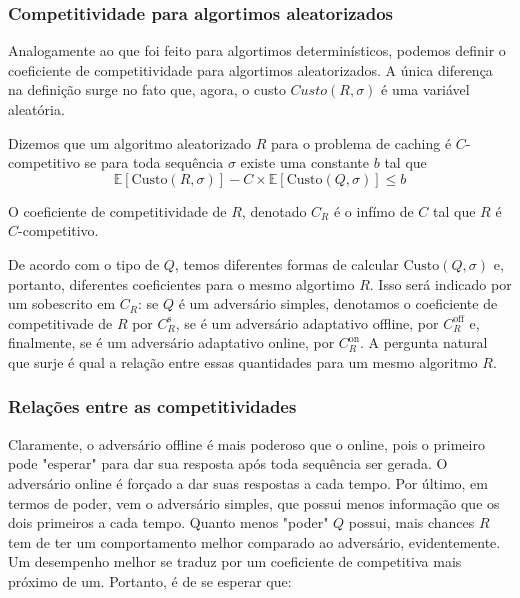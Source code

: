 \documentclass[a4paper,oneside,reqno,12pt]{amsart}
\begin{document}
\subsubsection{Competitividade para algortimos aleatorizados}

Analogamente ao que foi feito para algortimos determinísticos, podemos definir o coeficiente de competitividade para algortimos aleatorizados. A única diferença na definição surge no fato que, agora, o custo \(Custo(R, \sigma)\) é uma variável aleatória.

\begin{definition}
  Dizemos que um algoritmo aleatorizado \(R\) para o problema de caching é \(C\)-competitivo se para toda sequência \(\sigma\) existe uma constante \(b\) tal que
  \begin{equation}
    \mathbb{E}[\text{Custo}(R, \sigma)] - C \times \mathbb{E}[\text{Custo}(Q, \sigma)] \leqslant b
  \end{equation}
  
\end{definition}

O coeficiente de competitividade de \(R\), denotado \(C_R\) é o infímo de \(C\) tal que \(R\) é \(C\)-competitivo.

De acordo com o tipo de \(Q\), temos diferentes formas de calcular \(\text{Custo}(Q, \sigma)\) e, portanto, diferentes coeficientes para o mesmo algortimo \(R\). Isso será indicado por um sobescrito em \(C_R\): se \(Q\) é um adversário simples, denotamos o coeficiente de competitivade de \(R\) por \(C_R^{\text{s}}\), se é um adversário adaptativo offline, por \(C_R^{\text{off}}\) e, finalmente, se é um adversário adaptativo online, por \(C_R^{\text{on}}\). A pergunta natural que surje é qual a relação entre essas quantidades para um mesmo algoritmo \(R\).

\subsubsection{Relações entre as competitividades}

Claramente, o adversário offline é mais poderoso que o online, pois o primeiro pode "esperar" para dar sua resposta após toda sequência ser gerada. O adversário online é forçado a dar suas respostas a cada tempo. Por último, em termos de poder, vem o adversário simples, que possui menos informação que os dois primeiros a cada tempo. Quanto menos "poder" \(Q\) possui, mais chances \(R\) tem de ter um comportamento melhor comparado ao adversário, evidentemente. Um desempenho melhor se traduz por um coeficiente de competitiva mais próximo de um. Portanto, é de se esperar que:
\end{document}
